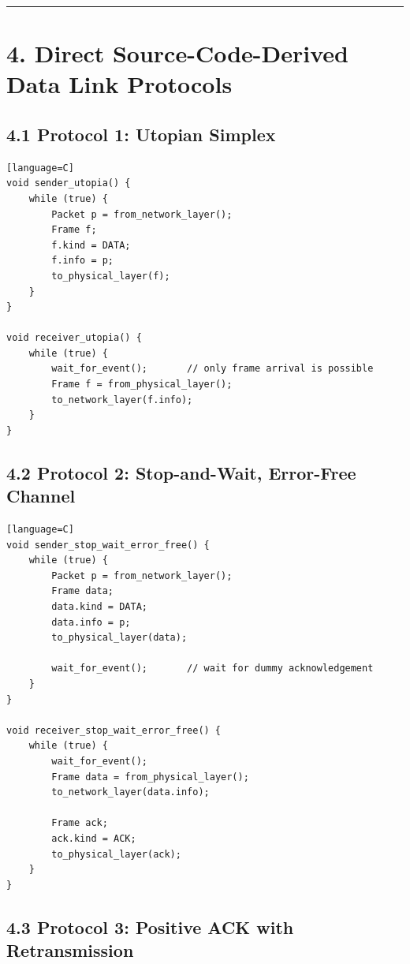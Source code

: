 \documentclass[11pt]{article}
\begin{document}
\begin{center}\rule{0.5\linewidth}{0.5pt}\end{center}

\section{4. Direct Source-Code-Derived Data Link
Protocols}\label{direct-source-code-derived-data-link-protocols}

\subsection{4.1 Protocol 1: Utopian
Simplex}\label{protocol-1-utopian-simplex}

\begin{verbatim}[language=C]
void sender_utopia() {
    while (true) {
        Packet p = from_network_layer();
        Frame f;
        f.kind = DATA;
        f.info = p;
        to_physical_layer(f);
    }
}

void receiver_utopia() {
    while (true) {
        wait_for_event();       // only frame arrival is possible
        Frame f = from_physical_layer();
        to_network_layer(f.info);
    }
}
\end{verbatim}

\subsection{4.2 Protocol 2: Stop-and-Wait, Error-Free
Channel}\label{protocol-2-stop-and-wait-error-free-channel}

\begin{verbatim}[language=C]
void sender_stop_wait_error_free() {
    while (true) {
        Packet p = from_network_layer();
        Frame data;
        data.kind = DATA;
        data.info = p;
        to_physical_layer(data);

        wait_for_event();       // wait for dummy acknowledgement
    }
}

void receiver_stop_wait_error_free() {
    while (true) {
        wait_for_event();
        Frame data = from_physical_layer();
        to_network_layer(data.info);

        Frame ack;
        ack.kind = ACK;
        to_physical_layer(ack);
    }
}
\end{verbatim}

\subsection{4.3 Protocol 3: Positive ACK with
Retransmission}\label{protocol-3-positive-ack-with-retransmission}
\end{document}
